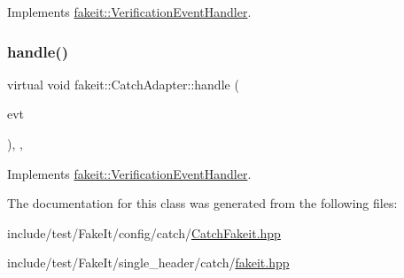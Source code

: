 Implements \mbox{\hyperlink{structfakeit_1_1VerificationEventHandler_adf355a9888bc2bf78ce0e1219bfb1379}{fakeit\+::\+Verification\+Event\+Handler}}.

\mbox{\label{classfakeit_1_1CatchAdapter_a44c05bbd7a09c63f357ef94345d085f5}} 
\subsubsection{\texorpdfstring{handle()}{handle()}\hspace{0.1cm}{\footnotesize\ttfamily [6/6]}}
{\footnotesize\ttfamily virtual void fakeit\+::\+Catch\+Adapter\+::handle (\begin{DoxyParamCaption}\item[{const \mbox{\hyperlink{structfakeit_1_1NoMoreInvocationsVerificationEvent}{No\+More\+Invocations\+Verification\+Event}} \&}]{evt }\end{DoxyParamCaption})\hspace{0.3cm}{\ttfamily [inline]}, {\ttfamily [override]}, {\ttfamily [virtual]}}



Implements \mbox{\hyperlink{structfakeit_1_1VerificationEventHandler_a826b9d15e23bad7013b219d8e45ef1d0}{fakeit\+::\+Verification\+Event\+Handler}}.



The documentation for this class was generated from the following files\+:\begin{DoxyCompactItemize}
\item 
include/test/\+Fake\+It/config/catch/\mbox{\hyperlink{CatchFakeit_8hpp}{Catch\+Fakeit.\+hpp}}\item 
include/test/\+Fake\+It/single\+\_\+header/catch/\mbox{\hyperlink{single__header_2catch_2fakeit_8hpp}{fakeit.\+hpp}}\end{DoxyCompactItemize}

